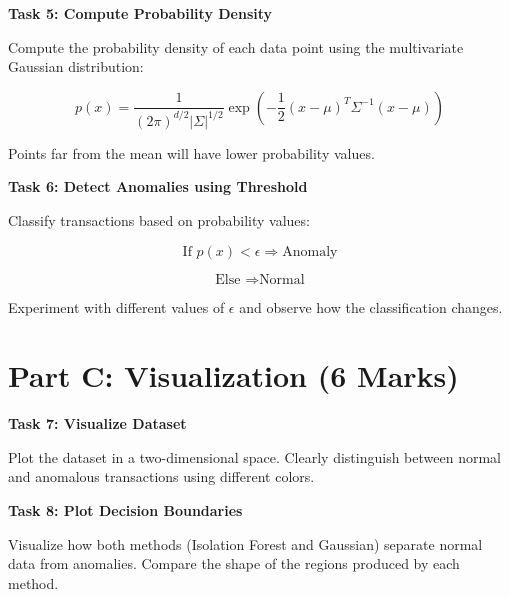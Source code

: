 \documentclass[12pt,a4paper]{article}
\begin{document}
\begin{tcolorbox}
\textbf{Task 5: Compute Probability Density}

Compute the probability density of each data point using the multivariate 
Gaussian distribution:

\[
p(x) = \frac{1}{(2\pi)^{d/2} |\Sigma|^{1/2}} 
\exp\left(-\frac{1}{2}(x-\mu)^T \Sigma^{-1} (x-\mu)\right)
\]

Points far from the mean will have lower probability values.

\vspace{2cm}

\vspace{2cm}
\end{tcolorbox}

\vspace{6pt}

\begin{tcolorbox}
\textbf{Task 6: Detect Anomalies using Threshold}

Classify transactions based on probability values:

\[
\text{If } p(x) < \epsilon \Rightarrow \text{Anomaly}
\]

\[
\text{Else } \Rightarrow \text{Normal}
\]

Experiment with different values of $\epsilon$ and observe how the classification changes.

\vspace{2cm}

\vspace{2cm}
\end{tcolorbox}


\section*{Part C: Visualization (6 Marks)}

\begin{tcolorbox}
\textbf{Task 7: Visualize Dataset}

Plot the dataset in a two-dimensional space. Clearly distinguish between 
normal and anomalous transactions using different colors.

\vspace{2cm}

\vspace{2cm}
\end{tcolorbox}

\vspace{6pt}

\begin{tcolorbox}
\textbf{Task 8: Plot Decision Boundaries}

Visualize how both methods (Isolation Forest and Gaussian) separate normal 
data from anomalies. Compare the shape of the regions produced by each method.

\vspace{2cm}

\vspace{2cm}
\end{tcolorbox}
\end{document}
